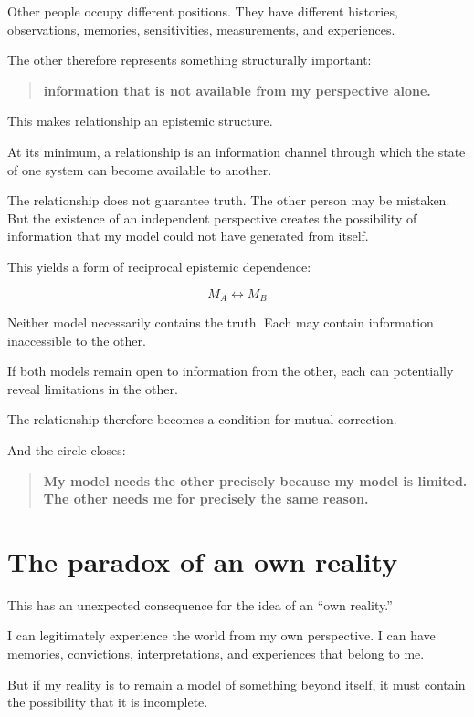 \documentclass{article}
\begin{document}
Other people occupy different positions. They have different histories, observations, memories, sensitivities, measurements, and experiences.

The other therefore represents something structurally important:

\begin{quote}
    \textbf{information that is not available from my perspective alone.}
\end{quote}

This makes relationship an epistemic structure.

At its minimum, a relationship is an information channel through which the state of one system can become available to another.

The relationship does not guarantee truth. The other person may be mistaken. But the existence of an independent perspective creates the possibility of information that my model could not have generated from itself.

This yields a form of reciprocal epistemic dependence:

\[
M_A \leftrightarrow M_B
\]

Neither model necessarily contains the truth. Each may contain information inaccessible to the other.

If both models remain open to information from the other, each can potentially reveal limitations in the other.

The relationship therefore becomes a condition for mutual correction.

And the circle closes:

\begin{quote}
    \textbf{My model needs the other precisely because my model is limited. The other needs me for precisely the same reason.}
\end{quote}

\section*{The paradox of an own reality}

This has an unexpected consequence for the idea of an ``own reality.''

I can legitimately experience the world from my own perspective. I can have memories, convictions, interpretations, and experiences that belong to me.

But if my reality is to remain a model of something beyond itself, it must contain the possibility that it is incomplete.
\end{document}
